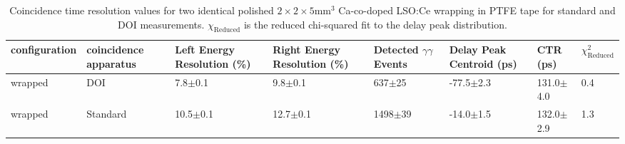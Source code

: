 \begin{table}
\caption{\label{tab:referencevals} Coincidence time resolution values for two identical polished $2\times2\times5$mm$^3$ Ca-co-doped LSO:Ce wrapping in PTFE tape for standard and DOI measurements. $\chi_\text{Reduced}$ is the reduced chi-squared fit to the delay peak distribution.}
\begin{tabular}{llllllll}
configuration &  coincidence apparatus & Left Energy Resolution (\%) & Right Energy Resolution (\%) & Detected $\gamma\gamma$ Events & Delay Peak Centroid (ps) & CTR (ps) &  $\chi^2_\text{Reduced}$ \\
\hline
      wrapped &     DOI &   7.8$\pm$0.1 &   9.8$\pm$0.1 &   637$\pm$25 &   -77.5$\pm$2.3 &  131.0$\pm$4.0 &        0.4 \\
      wrapped &   Standard &  10.5$\pm$0.1 &  12.7$\pm$0.1 &  1498$\pm$39 &   -14.0$\pm$1.5 &  132.0$\pm$2.9 &        1.3 \\
\hline
\end{tabular}
\end{table}
